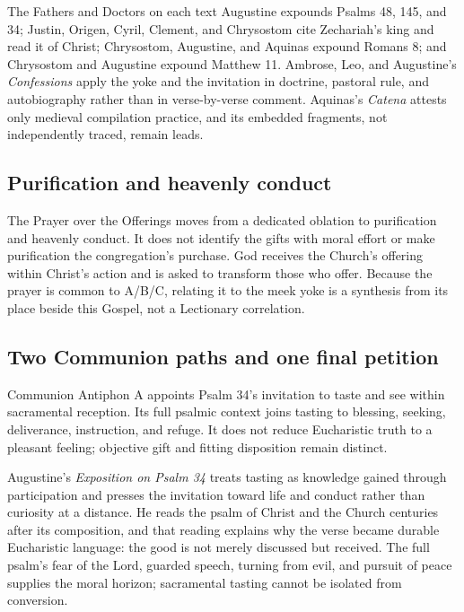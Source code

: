 \begin{studybox}{The Fathers and Doctors on each text}
Augustine expounds Psalms 48, 145, and 34; Justin, Origen, Cyril, Clement, and Chrysostom cite Zechariah's king and read it of Christ; Chrysostom, Augustine, and Aquinas expound Romans 8; and Chrysostom and Augustine expound Matthew 11. Ambrose, Leo, and Augustine's \emph{Confessions} apply the yoke and the invitation in doctrine, pastoral rule, and autobiography rather than in verse-by-verse comment. Aquinas's \emph{Catena} attests only medieval compilation practice, and its embedded fragments, not independently traced, remain leads.
\end{studybox}

\subsection*{Purification and heavenly conduct\enspace{}}

The Prayer over the Offerings moves from a dedicated oblation to purification and heavenly conduct. It does not identify the gifts with moral effort or make purification the congregation's purchase. God receives the Church's offering within Christ's action and is asked to transform those who offer. Because the prayer is common to A/B/C, relating it to the meek yoke is a synthesis from its place beside this Gospel, not a Lectionary correlation.

\subsection*{Two Communion paths and one final petition\enspace{}}

Communion Antiphon A appoints Psalm 34's invitation to taste and see within sacramental reception. Its full psalmic context joins tasting to blessing, seeking, deliverance, instruction, and refuge. It does not reduce Eucharistic truth to a pleasant feeling; objective gift and fitting disposition remain distinct.

Augustine's \emph{Exposition on Psalm 34} treats tasting as knowledge gained through participation and presses the invitation toward life and conduct rather than curiosity at a distance. He reads the psalm of Christ and the Church centuries after its composition, and that reading explains why the verse became durable Eucharistic language: the good is not merely discussed but received. The full psalm's fear of the Lord, guarded speech, turning from evil, and pursuit of peace supplies the moral horizon; sacramental tasting cannot be isolated from conversion.

